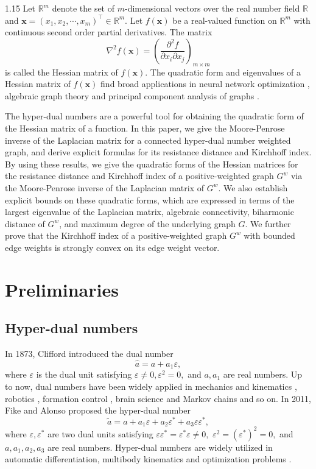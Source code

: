 \documentclass[preprint,12pt]{elsarticle1}
\numberwithin{equation}{section}
\begin{document}
\begin{spacing}{1.15}
 Let $\mathbb{R}^{m}$ denote the set of $m$-dimensional vectors over the real number field $\mathbb{R}$ and $\mathbf{x}=(x_{1},x_{2},\cdots,x_{m})^{\top}\in \mathbb{R}^{m}.$ Let $f(\textbf{x})$ be a real-valued function on $\mathbb{R}^{m}$ with continuous second order partial derivatives.
The matrix $$\nabla^{2} f(\textbf{x})=\left(\frac{\partial^{2} f}{\partial x_{i}\partial x_{j}}\right)_{m \times m}$$ is called the Hessian matrix of
$f(\mathbf{x})$. The quadratic form and eigenvalues of a Hessian matrix of $f(\mathbf{x})$ find broad applications in neural network optimization \cite{chen2021fast}, algebraic graph theory \cite{yazawa2021eigenvalues} and principal component analysis of graphs \cite{pan2019principal}.


The hyper-dual numbers are a powerful tool for obtaining the quadratic form of the Hessian matrix of a function. In this paper, we give the Moore-Penrose inverse of the Laplacian matrix for a connected hyper-dual number weighted graph, and derive explicit formulas for its resistance distance and Kirchhoff index.
By using these results, we give the quadratic forms of the Hessian matrices for the resistance distance and Kirchhoff index of a positive-weighted graph $G^{w}$ via  the Moore-Penrose inverse of the Laplacian matrix of $G^{w}$. We also establish explicit bounds on these quadratic forms, which are expressed  in terms of the largest eigenvalue of the Laplacian matrix, algebraic connectivity,  biharmonic distance of $G^{w}$, and maximum degree of the underlying  graph $G$. We further prove that the Kirchhoff index of a positive-weighted graph
$G^{w}$  with bounded edge weights  is strongly convex on its edge weight vector.


\section{Preliminaries}
\subsection{Hyper-dual numbers}
In 1873, Clifford introduced the dual number \cite{clifford1871preliminary}
$$\widehat{a}=a+a_{1}\varepsilon,$$
where $\varepsilon$ is the dual unit satisfying $\varepsilon\neq0, \varepsilon^{2}=0,$ and $a,a_{1}$ are real numbers. Up to now, dual numbers have been widely applied in mechanics and kinematics \cite{Geometry1010,fischer}, robotics \cite{gu1987dual}, formation control \cite{qi2024eigenvalues}, brain science \cite{wei2024singular} and Markov chains \cite{qi2024dualww} and so on.
In 2011, Fike and Alonso proposed the hyper-dual number \cite{fike2011development}
$$\widetilde{a}=a+a_{1}\varepsilon+a_{2}\varepsilon^{*}
 +a_{3}\varepsilon\varepsilon^{*},$$
 where $\varepsilon,\varepsilon^{*}$ are two dual units satisfying $\varepsilon\varepsilon^{*}=\varepsilon^{*}\varepsilon\neq 0, $ $ \varepsilon^{2}=(\varepsilon^{*})^{2}
=0,$ and $a,a_{1},a_{2},a_{3}$ are real numbers. Hyper-dual numbers are widely utilized in automatic differentiation, multibody kinematics and optimization problems \cite{fike2012automatic,murai2022method,cohen2016application}.


\end{spacing}
\end{document}
